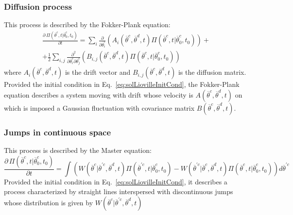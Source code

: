 \subsubsection{Diffusion process}
\label{subsec:CKDiffusion}
This process is described by the Fokker-Plank equation:
\begin{equation}
\begin{matrix}
\frac{\partial \, \Pi \left (\overline{\theta}^{c},t|\overline{\theta}^{c}_{0},t_{0}  \right ) }{\partial t} = 
\sum_{i}\frac{\partial }{\partial \overline{\theta}^{c}_{i}}\left ( A_{i}\left ( \overline{\theta}^{c},\overline{\theta}^{d},t \right ) \Pi \left (\overline{\theta}^{c},t|\overline{\theta}^{c}_{0},t_{0}  \right ) \right ) +
\\
+ \frac{1}{2}\sum_{i,j} \frac{\partial^2 }{\partial \overline{\theta}^{c}_{i} \partial \overline{\theta}^{c}_{j}}\left ( B_{i,j}\left (  \overline{\theta}^{c}, \overline{\theta}^{d}, t\right ) \Pi \left (\overline{\theta}^{c},t|\overline{\theta}_{0}^{c},t_{0}  
\right )  \right ) 
\end{matrix}
\end{equation}
where $A_{i}\left ( \overline{\theta}^{c},\overline{\theta}^{d},t \right )$ is the drift vector and $B_{i,j}\left (  \overline{\theta}^{c}, \overline{\theta}^{d}, t\right ) $  is the diffusion matrix. 
\\Provided the initial condition in Eq.~\ref{eq:solLiovilleInitCond}, the Fokker-Plank equation describes a system moving with drift whose velocity is 
 $A\left ( \overline{\theta}^{c},\overline{\theta}^{d},t \right )$ on which is imposed a Gaussian fluctuation with covariance matrix $B\left (  \overline{\theta}^{c}, \overline{\theta}^{d}, t\right ) $.
%
%
%
%
\subsubsection{Jumps in continuous space }
\label{subsec:CKJumpsCont}
This process is described by the Master equation:
\begin{equation}
\frac{\partial \, \Pi \left (\overline{\theta}^{c},t|\overline{\theta}^{c}_{0},t_{0}  \right ) }{\partial t} =  \int \left (  W\left ( \overline{\theta}^{c}|
\overline{\theta}^{'c},\overline{\theta}^{d},t \right )\Pi \left (\overline{\theta}^{'c},t|\overline{\theta}_{0}^{c},t_{0}  
\right ) - W\left ( \overline{\theta}^{'c}|
\overline{\theta}^{c},\overline{\theta}^{d},t \right )\Pi \left (\overline{\theta}^{c},t|\overline{\theta}_{0}^{c},t_{0}  
\right )  \right )d\overline{\theta}^{'c}
\end{equation}
Provided the initial condition  in Eq.~\ref{eq:solLiovilleInitCond}, it describes a process characterized by 
straight lines interspersed with discontinuous jumps whose distribution is given by $W\left ( \overline{\theta}^{c}|
\overline{\theta}^{'c},\overline{\theta}^{d},t \right )$

